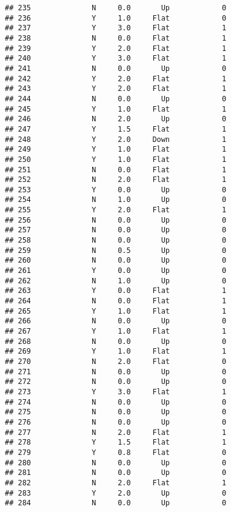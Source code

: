 \documentclass[
]{article}
\begin{document}
\begin{verbatim}
## 235              N     0.0       Up            0
## 236              Y     1.0     Flat            0
## 237              Y     3.0     Flat            1
## 238              N     0.0     Flat            1
## 239              Y     2.0     Flat            1
## 240              Y     3.0     Flat            1
## 241              N     0.0       Up            0
## 242              Y     2.0     Flat            1
## 243              Y     2.0     Flat            1
## 244              N     0.0       Up            0
## 245              Y     1.0     Flat            1
## 246              N     2.0       Up            0
## 247              Y     1.5     Flat            1
## 248              Y     2.0     Down            1
## 249              Y     1.0     Flat            1
## 250              Y     1.0     Flat            1
## 251              N     0.0     Flat            1
## 252              N     2.0     Flat            1
## 253              Y     0.0       Up            0
## 254              N     1.0       Up            0
## 255              Y     2.0     Flat            1
## 256              N     0.0       Up            0
## 257              N     0.0       Up            0
## 258              N     0.0       Up            0
## 259              N     0.5       Up            0
## 260              N     0.0       Up            0
## 261              Y     0.0       Up            0
## 262              N     1.0       Up            0
## 263              Y     0.0     Flat            1
## 264              N     0.0     Flat            1
## 265              Y     1.0     Flat            1
## 266              N     0.0       Up            0
## 267              Y     1.0     Flat            1
## 268              N     0.0       Up            0
## 269              Y     1.0     Flat            1
## 270              N     2.0     Flat            0
## 271              N     0.0       Up            0
## 272              N     0.0       Up            0
## 273              Y     3.0     Flat            1
## 274              N     0.0       Up            0
## 275              N     0.0       Up            0
## 276              N     0.0       Up            0
## 277              N     2.0     Flat            1
## 278              Y     1.5     Flat            1
## 279              Y     0.8     Flat            0
## 280              N     0.0       Up            0
## 281              N     0.0       Up            0
## 282              N     2.0     Flat            1
## 283              Y     2.0       Up            0
## 284              N     0.0       Up            0

\end{verbatim}
\end{document}
